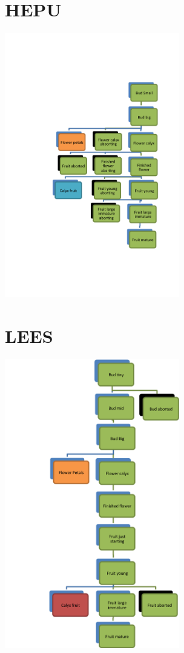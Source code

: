\documentclass[10pt]{book} %
\begin{document}
\section{HEPU}
\begin{multicols}{2}
\includegraphics[width=3in]{images/HEPU.png}
\vfill
\columnbreak

\end{multicols}

\clearpage
\newpage

\section{LEES}
\begin{multicols}{2}
\includegraphics[width=3in]{images/LEES.png}
\vfill
\columnbreak

\\
\end{multicols}
\clearpage
\newpage
\end{document}
